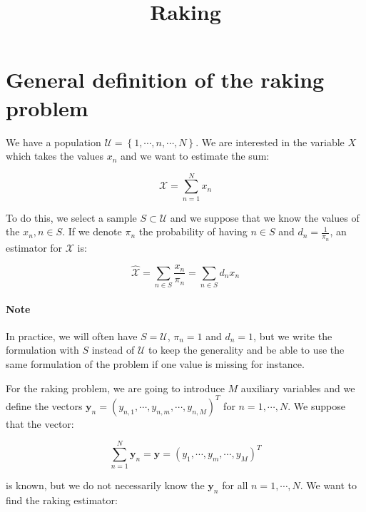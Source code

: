 \documentclass{tex/note}
\title{Raking}
\author{}
\begin{document}
\maketitle

\section{General definition of the raking problem}

We have a population $\mathcal{U} = \left\{ 1 , \cdots , n, \cdots , N \right\}$. We are interested in the variable $X$ which takes the values $x_n$ and we want to estimate the sum:

\begin{equation*}
\mathcal{X} = \sum_{n = 1}^N x_n
\end{equation*}

To do this, we select a sample $S \subset \mathcal{U}$ and we suppose that we know the values of the $x_n , n \in S$. If we denote $\pi_n$ the probability of having $n \in S$ and $d_n = \frac{1}{\pi_n}$, an estimator for $\mathcal{X}$ is:

\begin{equation*}
\hat{\mathcal{X}} = \sum_{n \in S} \frac{x_n}{\pi_n} = \sum_{n \in S} d_n x_n
\end{equation*}

\paragraph{Note}In practice, we will often have $S = \mathcal{U}$, $\pi_n = 1$ and $d_n = 1$, but we write the formulation with $S$ instead of $\mathcal{U}$ to keep the generality and be able to use the same formulation of the problem if one value is missing for instance.

\vspace{1em}

For the raking problem, we are going to introduce $M$ auxiliary variables and we define the vectors $\bm{y}_n = \left( y_{n,1} , \cdots , y_{n,m} , \cdots , y_{n,M} \right) ^T$ for $n = 1 , \cdots , N$. We suppose that the vector:

\begin{equation*}
\sum_{n = 1}^N \bm{y}_n = \bm{y} = \left( y_1 , \cdots , y_m , \cdots , y_M \right)^T
\end{equation*}

is known, but we do not necessarily know the $\bm{y}_n$ for all $n = 1, \cdots , N$. We want to find the raking estimator:
\end{document}

